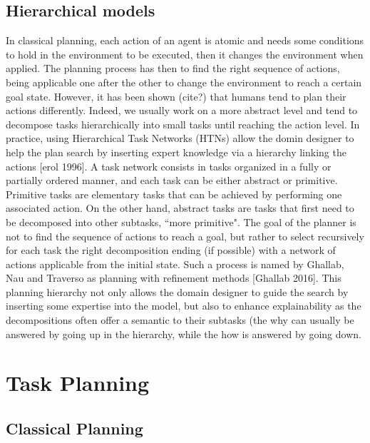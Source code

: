\subsection{Hierarchical models}

In classical planning, each action of an agent is atomic and needs some conditions to hold in the environment to be executed, then it changes the environment when applied. The planning process has then to find the right sequence of actions, being applicable one after the other to change the environment to reach a certain goal state. 
However, it has been shown (cite?) that humans tend to plan their actions differently. Indeed, we usually work on a more abstract level and tend to decompose tasks hierarchically into small tasks until reaching the action level. In practice, using Hierarchical Task Networks (HTNs) allow the domin designer to help the plan search by inserting expert knowledge via a hierarchy linking the actions [erol 1996]. A task network consists in tasks organized in a fully or partially ordered manner, and each task can be either abstract or primitive. Primitive tasks are elementary tasks that can be achieved by performing one associated action. On the other hand, abstract tasks are tasks that first need to be decomposed into other subtasks, ``more primitive". The goal of the planner is not to find the sequence of actions to reach a goal, but rather to select recursively for each task the right decomposition ending (if possible) with a network of actions applicable from the initial state. Such a process is named by Ghallab, Nau and Traverso as planning with refinement methods [Ghallab 2016]. This planning hierarchy not only allows the domain designer to guide the search by inserting some expertise into the model, but also to enhance explainability as the decompositions often offer a semantic to their subtasks (the why can usually be answered by going up in the hierarchy, while the how is answered by going down. 

\section{Task Planning}

\subsection{Classical Planning}

